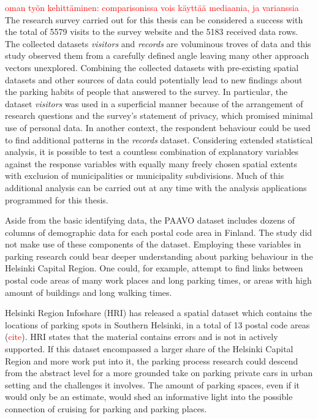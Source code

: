 \textcolor{red}{oman työn kehittäminen: comparisonissa vois käyttää mediaania, ja varianssia} \\
The research survey carried out for this thesis can be considered a success with the total of 5579 visits to the survey website and the 5183 received data rows. The collected datasets \textit{visitors} and \textit{records} are voluminous troves of data and this study observed them from a carefully defined angle leaving many other approach vectors unexplored. Combining the collected datasets with pre-existing spatial datasets and other sources of data could potentially lead to new findings about the parking habits of people that answered to the survey. In particular, the dataset \textit{visitors} was used in a superficial manner because of the arrangement of research questions and the survey's statement of privacy, which promised minimal use of personal data. In another context, the respondent behaviour could be used to find additional patterns in the \textit{records} dataset. Considering extended statistical analysis, it is possible to test a countless combination of explanatory variables against the response variables with equally many freely chosen spatial extents with exclusion of municipalities or municipality subdivisions. Much of this additional analysis can be carried out at any time with the analysis applications programmed for this thesis.

Aside from the basic identifying data, the PAAVO dataset includes dozens of columns of demographic data for each postal code area in Finland. The study did not make use of these components of the dataset. Employing these variables in parking research could bear deeper understanding about parking behaviour in the Helsinki Capital Region. One could, for example, attempt to find links between postal code areas of many work places and long parking times, or areas with high amount of buildings and long walking times.

Helsinki Region Infoshare (HRI) has released a spatial dataset which contains the locations of parking spots in Southern Helsinki, in a total of 13 postal code areas (\textcolor{red}{cite}). HRI states that the material contains errors and is not in actively supported. If this dataset encompassed a larger share of the Helsinki Capital Region and more work put into it, the parking process research could descend from the abstract level for a more grounded take on parking private cars in urban setting and the challenges it involves. The amount of parking spaces, even if it would only be an estimate, would shed an informative light into the possible connection of cruising for parking and parking places.

